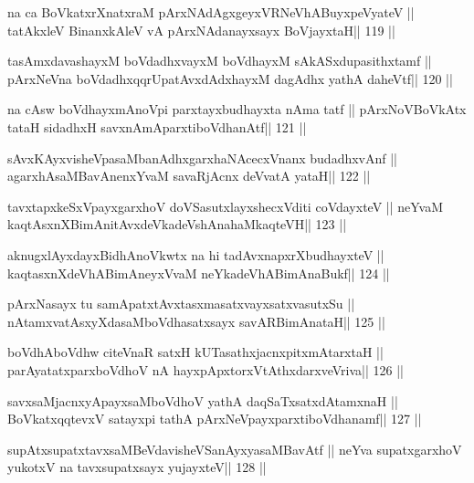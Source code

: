 \begin{shl}
na ca BoVkatxrXnatxraM pArxNAdAgxgeyxVRNeVhABuyxpeVyateV ||
tatAkxleV BinanxkAleV vA pArxNAdanayxsayx BoVjayxtaH\hfill || 119 ||
\end{shl}

\begin{shl}
tasAmxdavashayxM boVdadhxvayxM boVdhayxM sAkASxdupasithxtamf ||
pArxNeVna boVdadhxqqrUpatAvxdAdxhayxM dagAdhx yathA daheVtf\hfill || 120 ||
\end{shl}

\begin{shl}
na cAsw boVdhayxmAnoV\s pi parxtayxbudhayxta nAma tatf ||
pArxNoV\s BoVkAtx tataH sidadhxH savxnAmAparxtiboVdhanAtf\hfill || 121 ||
\end{shl}

\begin{shl}
sAvxKAyxvisheVpasaMbanAdhxgarxhaNAcecxVnanx budadhxvAnf ||
agarxhAsaMBavAnenxYvaM savaRjAcnx deVvatA yataH\hfill || 122 ||
\end{shl}

\begin{shl}
tavxtapxkeSxV\s payxgarxhoV doVSasutxlayxshecxVditi coVdayxteV ||
neYvaM kaqtAsxnXBimAnitAvxdeVkadeVshAnahaMkaqteVH\hfill || 123 ||
\end{shl}

\begin{shl}
aknugxlAyxdayxBidhAnoVkwtx na hi tadAvxnapxrXbudhayxteV ||
kaqtasxnXdeVhABimAneyxVvaM neYkadeVhABimAnaBukf\hfill || 124 ||
\end{shl}

\begin{shl}
pArxNasayx tu samApatxtAvxtasxmasatxvayxsatxvasutxSu ||
nA\s\s tamxvatAsxyXdasaMboVdhasatxsayx savARBimAnataH\hfill || 125 ||
\end{shl}

\begin{shl}
boVdhAboVdhw citeVnaR satxH kUTasathxjacnxpitxmAtarxtaH ||
parAyatatxparxboVdhoV nA hayxpApxtorxVtAthxdarxveVriva\hfill || 126 ||
\end{shl}

\begin{shl}
savxsaMjacnxyA\s payxsaMboVdhoV yathA daqSaTxsatxdAtamxnaH ||
BoVkatxqqtevxV satayxpi tathA pArxNeV\s payxparxtiboVdhanamf\hfill || 127 ||
\end{shl}

\begin{shl}
supAtxsupatxtavxsaMBeVdavisheVSanAyxyasaMBavAtf ||
neYva supatxgarxhoV yukotxV na tavxsupatxsayx yujayxteV\hfill || 128 ||
\end{shl}

